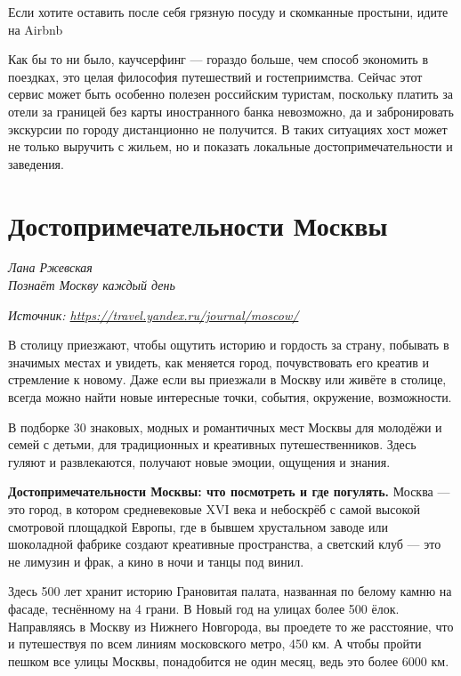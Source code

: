 \begin{center}
    \Large
    Если хотите оставить после себя грязную посуду и скомканные простыни, идите на Airbnb
\end{center}

Как бы то ни было, каучсерфинг — гораздо больше, чем способ экономить в поездках, это целая философия путешествий и гостеприимства. Сейчас этот сервис может быть особенно полезен российским туристам, поскольку платить за отели за границей без карты иностранного банка невозможно, да и забронировать экскурсии по городу дистанционно не получится. В таких ситуациях хост может не только выручить с жильем, но и показать локальные достопримечательности и заведения.

\newpage
\section{Достопримечательности Москвы}

\textit{Лана Ржевская\\
    Познаёт Москву каждый день}

\textit{Источник: \url{https://travel.yandex.ru/journal/moscow/}}

В столицу приезжают, чтобы ощутить историю и гордость за страну, побывать в значимых местах и увидеть, как меняется город, почувствовать его креатив и стремление к новому. Даже если вы приезжали в Москву или живёте в столице, всегда можно найти новые интересные точки, события, окружение, возможности.

В подборке 30 знаковых, модных и романтичных мест Москвы для молодёжи и семей с детьми, для традиционных и креативных путешественников. Здесь гуляют и развлекаются, получают новые эмоции, ощущения и знания.


\textbf{Достопримечательности Москвы: что посмотреть и где погулять.} Москва --- это город, в котором  средневековые  XVI века и небоскрёб с самой высокой смотровой площадкой Европы, где в бывшем хрустальном заводе или шоколадной фабрике создают креативные пространства, а светский клуб --- это не лимузин и фрак, а кино в ночи и танцы под винил.

Здесь 500 лет хранит историю Грановитая палата, названная по белому камню на фасаде, теснённому на 4 грани. В Новый год на улицах  более 500 ёлок. Направляясь в Москву из Нижнего Новгорода, вы проедете то же расстояние, что и путешествуя по всем линиям московского метро, 450 км. А чтобы пройти пешком все улицы Москвы, понадобится не один месяц, ведь это более 6000 км.

